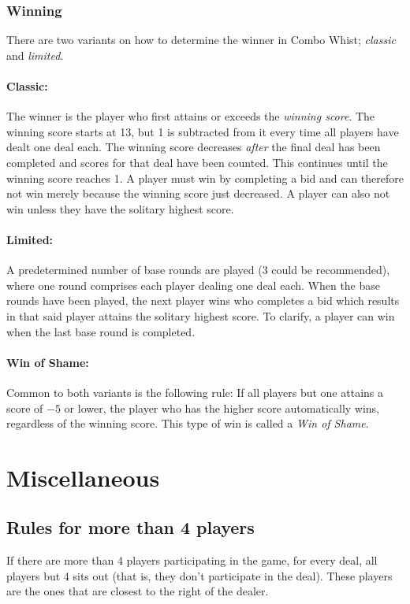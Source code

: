 \documentclass[a4paper]{article}
\begin{document}
			\subsubsection{Winning}
				\label{sec:winning}
				There are two variants on how to determine the winner in Combo Whist; \emph{classic} and \emph{limited}.

				\paragraph{Classic:}
				The winner is the player who first attains or exceeds the \emph{winning score}. The winning score starts at 13, but 1 is subtracted from it every time all players have dealt one deal each. The winning score decreases \emph{after} the final deal has been completed and scores for that deal have been counted. This continues until the winning score reaches 1. A player must win by completing a bid and can therefore not win merely because the winning score just decreased. A player can also not win unless they have the solitary highest score.

				\paragraph{Limited:}
				A predetermined number of base rounds are played (3 could be recommended), where one round comprises each player dealing one deal each. When the base rounds have been played, the next player wins who completes a bid which results in that said player attains the solitary highest score. To clarify, a player can win when the last base round is completed.

				\paragraph{Win of Shame:}
				Common to both variants is the following rule: If all players but one attains a score of $-5$ or lower, the player who has the higher score automatically wins, regardless of the winning score. This type of win is called a \emph{Win of Shame}.

	\section{Miscellaneous}
		\subsection{Rules for more than 4 players}
			If there are more than 4 players participating in the game, for every deal, all players but 4 sits out (that is, they don't participate in the deal). These players are the ones that are closest to the right of the dealer.
		
\end{document}

